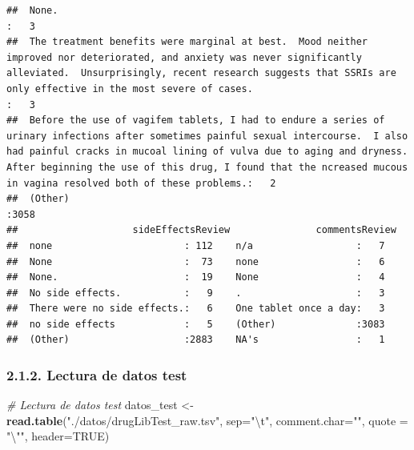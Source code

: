 \documentclass[spanish,]{article}
\newenvironment{Shaded}{\begin{snugshade}}{\end{snugshade}}
\newcommand{\KeywordTok}[1]{\textcolor[rgb]{0.13,0.29,0.53}{\textbf{#1}}}
\newcommand{\DataTypeTok}[1]{\textcolor[rgb]{0.13,0.29,0.53}{#1}}
\newcommand{\CharTok}[1]{\textcolor[rgb]{0.31,0.60,0.02}{#1}}
\newcommand{\StringTok}[1]{\textcolor[rgb]{0.31,0.60,0.02}{#1}}
\newcommand{\CommentTok}[1]{\textcolor[rgb]{0.56,0.35,0.01}{\textit{#1}}}
\newcommand{\OtherTok}[1]{\textcolor[rgb]{0.56,0.35,0.01}{#1}}
\newcommand{\NormalTok}[1]{#1}
\begin{document}
\begin{verbatim}
##  None.                                                                                                                                                                                                                                                                                                                          :   3  
##  The treatment benefits were marginal at best.  Mood neither improved nor deteriorated, and anxiety was never significantly alleviated.  Unsurprisingly, recent research suggests that SSRIs are only effective in the most severe of cases.                                                                                    :   3  
##  Before the use of vagifem tablets, I had to endure a series of urinary infections after sometimes painful sexual intercourse.  I also had painful cracks in mucoal lining of vulva due to aging and dryness.  After beginning the use of this drug, I found that the ncreased mucous in vagina resolved both of these problems.:   2  
##  (Other)                                                                                                                                                                                                                                                                                                                        :3058  
##                    sideEffectsReview               commentsReview
##  none                       : 112    n/a                  :   7  
##  None                       :  73    none                 :   6  
##  None.                      :  19    None                 :   4  
##  No side effects.           :   9    .                    :   3  
##  There were no side effects.:   6    One tablet once a day:   3  
##  no side effects            :   5    (Other)              :3083  
##  (Other)                    :2883    NA's                 :   1
\end{verbatim}

\subsubsection{2.1.2. Lectura de datos
test}\label{lectura-de-datos-test}

\begin{Shaded}
\begin{Highlighting}[]
\CommentTok{# Lectura de datos test}
\NormalTok{datos_test <-}\StringTok{ }\KeywordTok{read.table}\NormalTok{(}\StringTok{"./datos/drugLibTest_raw.tsv"}\NormalTok{, }\DataTypeTok{sep=}\StringTok{"}\CharTok{\textbackslash{}t}\StringTok{"}\NormalTok{, }\DataTypeTok{comment.char=}\StringTok{""}\NormalTok{,}
                         \DataTypeTok{quote =} \StringTok{"}\CharTok{\textbackslash{}"}\StringTok{"}\NormalTok{, }\DataTypeTok{header=}\OtherTok{TRUE}\NormalTok{)}
\end{Highlighting}
\end{Shaded}
\end{document}
